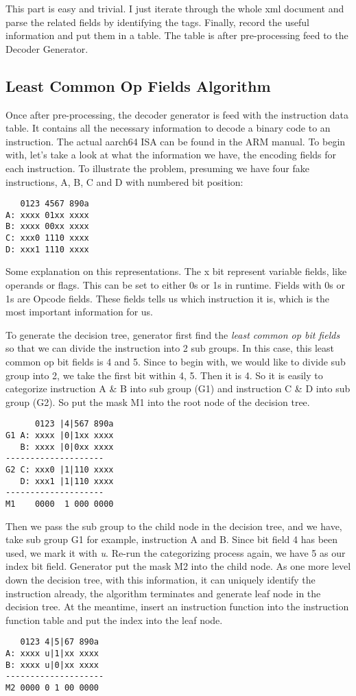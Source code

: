 \documentclass[]{article}
\begin{document}
This part is easy and trivial. I just iterate through the whole xml document and parse the related fields by identifying the tags. Finally, record the useful information and put them in a table. The table is after pre-processing feed to the Decoder Generator.


\subsection{Least Common Op Fields Algorithm}
Once after pre-processing, the decoder generator is feed with the instruction data table. It contains all the necessary information
to decode a binary code to an instruction. The actual aarch64 ISA can be found in the ARM manual\cite{ARMManual}. To begin with, let's take a look at what the information we have, the encoding fields for 
each instruction. To illustrate the problem, presuming we have four fake instructions, A, B, C and D with numbered bit position:

\begin{lstlisting}
   0123 4567 890a
A: xxxx 01xx xxxx
B: xxxx 00xx xxxx
C: xxx0 1110 xxxx
D: xxx1 1110 xxxx
\end{lstlisting}

Some explanation on this representations. The x bit represent variable fields, like operands or flags. This can be set to either 0s or
1s in runtime. Fields with 0s or 1s are Opcode fields. These fields tells us which instruction it is, which is the most important
information for us.

To generate the decision tree, generator first find the \textit{least common op bit fields} so that we can divide the instruction into
2 sub groups. In this case, this least common op bit fields is 4 and 5. Since to begin with, we would like to divide sub group into 2,
we take the first bit within 4, 5. Then it is 4. So it is easily to categorize instruction A \& B into sub group (G1) and instruction 
C \& D into sub group (G2). So put the mask M1 into the root node of the decision tree.

\begin{lstlisting}
      0123 |4|567 890a
G1 A: xxxx |0|1xx xxxx
   B: xxxx |0|0xx xxxx
--------------------
G2 C: xxx0 |1|110 xxxx
   D: xxx1 |1|110 xxxx
--------------------
M1    0000  1 000 0000
\end{lstlisting}

Then we pass the sub group to the child node in the decision tree, and we have, take sub group G1 for example, instruction A and B.
Since bit field 4 has been used, we mark it with \textit{u}. Re-run the categorizing process again, we have 5 as our index bit field.
Generator put the mask M2 into the child node. As one more level down the decision tree, with this information, it can uniquely identify the instruction already, the algorithm terminates and generate leaf node in the decision tree. At the meantime, insert an instruction function into the instruction function table and put the index into the leaf node.
\begin{lstlisting}
   0123 4|5|67 890a
A: xxxx u|1|xx xxxx
B: xxxx u|0|xx xxxx
--------------------
M2 0000 0 1 00 0000
\end{lstlisting}
\end{document}
